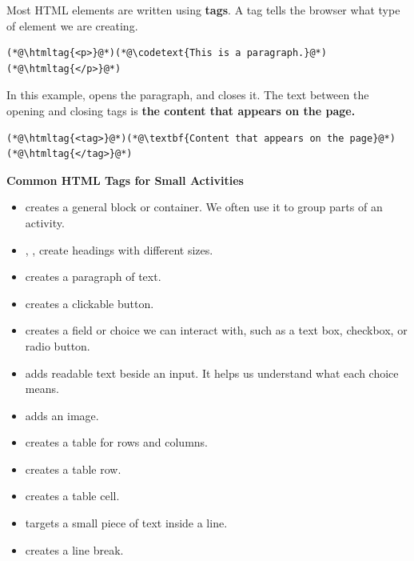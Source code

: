 \documentclass{article}
\begin{document}
Most HTML elements are written using \textbf{tags}.
A tag tells the browser what type of element we are creating.

\vspace{0.2cm}

\begin{lstlisting}
(*@\htmltag{<p>}@*)(*@\codetext{This is a paragraph.}@*)(*@\htmltag{</p>}@*)
\end{lstlisting}

In this example,  opens the paragraph, and  closes it.
The text between the opening and closing tags is \textbf{the content that appears on the page.}

\vspace{0.2cm}

\begin{lstlisting}
(*@\htmltag{<tag>}@*)(*@\textbf{Content that appears on the page}@*)(*@\htmltag{</tag>}@*)
\end{lstlisting}

\vspace{0.4cm}

\textbf{\Bitter\textcolor{naranja}{Common HTML Tags for Small Activities}}

\vspace{0.1cm}

\begin{itemize}[leftmargin=1.2cm, itemsep=4pt]
  \item {} creates a general block or container. We often use it to group parts of an activity.
  \item {}, ,  create headings with different sizes.
  \item {} creates a paragraph of text.
  \item {} creates a clickable button.
  \item {} creates a field or choice we can interact with, such as a text box, checkbox, or radio button.
  \item {} adds readable text beside an input. It helps us understand what each choice means.
  \item {} adds an image.
  \item {} creates a table for rows and columns.
  \item {} creates a table row.
  \item {} creates a table cell.
  \item {} targets a small piece of text inside a line.
  \item {} creates a line break.
\end{itemize}
\end{document}
